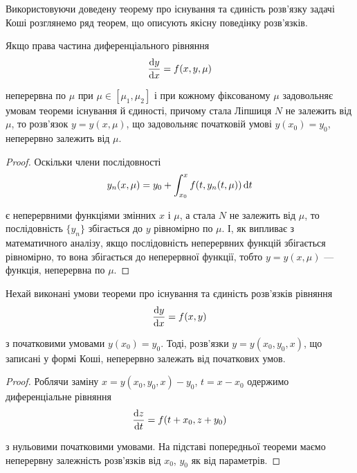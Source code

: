 Використовуючи доведену теорему про існування та єдиність роз\-в'яз\-ку задачі Коші розглянемо ряд теорем, що описують якісну поведінку роз\-в'яз\-ків.

\begin{theorem}
	Якщо права частина диференціального рівняння
	\begin{equation*}
		\frac{\mathop{}\!\mathrm{d} y}{\mathop{}\!\mathrm{d} x} = f(x, y, \mu)
	\end{equation*}

	неперервна по $\mu$ при $\mu \in [\mu_1, \mu_2]$ і при кожному фіксованому $\mu$ задовольняє умовам теореми існування й єдиності, причому стала Ліпшиця $N$ не залежить від $\mu$, то розв'язок $y = y(x, \mu)$, що задовольняє початковій умові $y(x_0)=y_0$, неперервно залежить від $\mu$.
\end{theorem}

\begin{proof} 
	Оскільки члени послідовності
	\begin{equation*}
		y_n(x, \mu) = y_0 + \int_{x_0}^x f(t, y_n(t, \mu)) \mathop{}\!\mathrm{d} t
	\end{equation*}

	є неперервними функціями змінних $x$ і $\mu$, а стала $N$ не залежить від $\mu$, то послідовність $\{y_n\}$ збігається до $y$ рівномірно по $\mu$. І, як випливає з математичного аналізу, якщо послідовність неперервних функцій збігається рівномірно, то вона збігається до неперервної функції, тобто $y=y(x,\mu)$ --- функція, неперервна по $\mu$.
\end{proof}

\begin{theorem}
	Нехай виконані умови теореми про існування та єдиність роз\-в'я\-зків рівняння
	\begin{equation*}
		\frac{\mathop{}\!\mathrm{d} y}{\mathop{}\!\mathrm{d} x} = f(x,y)
	\end{equation*}

	з початковими умовами $y(x_0) = y_0$. Тоді, розв'язки $y=y(x_0,y_0,x)$, що записані у формі Коші, неперервно залежать від початкових умов. 
\end{theorem}

\begin{proof}
	Роблячи заміну $x = y(x_0, y_0, x) - y_0$, $t = x - x_0$ одержимо диференціальне рівняння  
	\begin{equation*}
		\frac{\mathop{}\!\mathrm{d} z}{\mathop{}\!\mathrm{d} t} = f(t + x_0, z + y_0)
	\end{equation*}

	з нульовими початковими умовами. На підставі попередньої теореми маємо неперервну залежність розв'язків від $x_0$, $y_0$ як від параметрів.
\end{proof}

